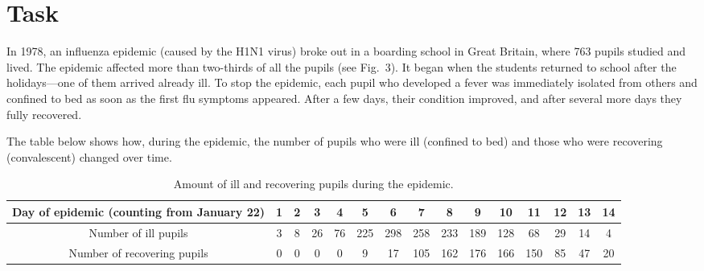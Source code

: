\section*{Task}

In 1978, an influenza epidemic (caused by the H1N1 virus) broke out in a boarding school
in Great Britain, where 763 pupils studied and lived. The epidemic affected more than
two-thirds of all the pupils (see Fig.~3). It began when the students returned to school
after the holidays—one of them arrived already ill. To stop the epidemic, each pupil who
developed a fever was immediately isolated from others and confined to bed as soon as the
first flu symptoms appeared. After a few days, their condition improved, and after several
more days they fully recovered.

The table below shows how, during the epidemic, the number of pupils who were ill
(confined to bed) and those who were recovering (convalescent) changed over time.

\begin{table}[h!]
\centering
\caption{Amount of ill and recovering pupils during the epidemic.}
\begin{tabular}{ccccccccccccccc}
\toprule
Day of epidemic
(counting from January 22) &
1 & 2 & 3 & 4 & 5 & 6 & 7 & 8 & 9 & 10 & 11 & 12 & 13 & 14 \\
\midrule
Number of ill pupils &
3 & 8 & 26 & 76 & 225 & 298 & 258 & 233 & 189 & 128 & 68 & 29 & 14 & 4 \\
Number of recovering pupils &
0 & 0 & 0 & 0 & 9 & 17 & 105 & 162 & 176 & 166 & 150 & 85 & 47 & 20 \\
\bottomrule
\end{tabular}
\end{table}

